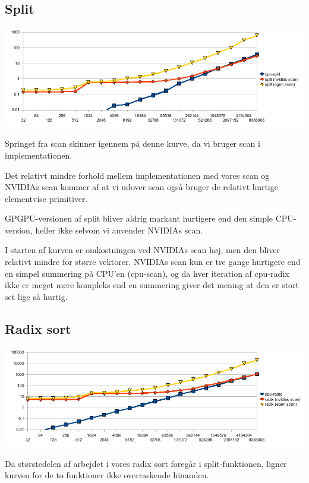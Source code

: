 \subsection{Split}

\includegraphics[width=1.0\textwidth]{bench-split.png}

Springet fra scan skinner igennem på denne kurve, da vi bruger scan i implementationen.

Det relativt mindre forhold mellem implementationen med vores scan og NVIDIAs scan kommer
af at vi udover scan også bruger de relativt hurtige elementvise primitiver.

GPGPU-versionen af split bliver aldrig markant hurtigere end den simple CPU-version,
heller ikke selvom vi anvender NVIDIAs scan.

I starten af kurven er omkostningen ved NVIDIAs scan høj, men den bliver relativt mindre
for større vektorer. NVIDIAs scan kun er tre gange hurtigere end en simpel summering på 
CPU'en (cpu-scan), og da hver iteration af cpu-radix ikke er meget mere kompleks end en
summering giver det mening at den er stort set lige så hurtig.

\subsection{Radix sort}

\includegraphics[width=1.0\textwidth]{bench-radix.png}

Da størstedelen af arbejdet i vores radix sort foregår i split-funktionen,
ligner kurven for de to funktioner ikke overraskende hinanden. 


